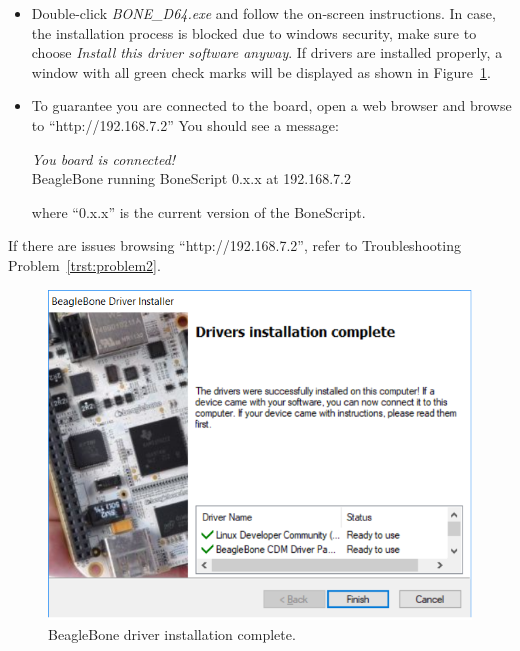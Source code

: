 \begin{mdframed}[frametitle=Install BeagleBone Driver and Browse BeagleBone's webserver, backgroundcolor=yellow!5, roundcorner=7pt,outerlinecolor= blue!70!black,outerlinewidth=1.2]
  \begin{itemize}
  \item Double-click \emph{BONE\_D64.exe} and follow the on-screen instructions.
    In case, the installation process is blocked due to windows security, make
    sure to choose \emph{Install this driver software anyway}. If drivers are
    installed properly, a window with all green check marks will be displayed as
    shown in Figure~\ref{fig:BBBlue-DriverInstalation}.
    
  \item To guarantee you are connected to the board, open a web browser and browse to ``http://192.168.7.2'' You should see a message:

    \emph{You board is connected!}\\
    \noindent BeagleBone running BoneScript 0.x.x at 192.168.7.2 

where ``0.x.x'' is the current version of the BoneScript. 
  \end{itemize}
  
\end{mdframed}

If there are issues browsing  ``http://192.168.7.2'', refer to Troubleshooting
Problem~\ref{trst:problem2}. %
%
  \begin{figure}
    \centering
    \includegraphics[scale=0.5]{figs/img/Lab0/BBB-DriverInstalation}
    \caption{BeagleBone driver installation complete.}
    \label{fig:BBBlue-DriverInstalation}
  \end{figure}
%

